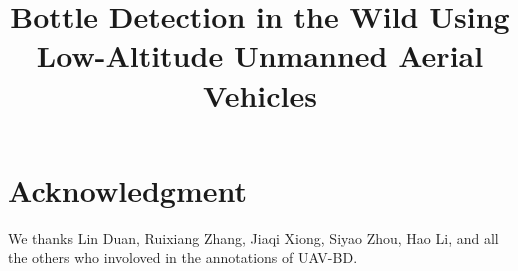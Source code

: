 \documentclass[conference]{IEEEtran}
\begin{document}
\title{Bottle Detection in the Wild Using Low-Altitude Unmanned Aerial Vehicles
}
\author{


}

\maketitle















\section*{Acknowledgment}

We thanks Lin Duan, Ruixiang Zhang, Jiaqi Xiong, Siyao Zhou, Hao Li, and all the others who involoved in the annotations of UAV-BD.

\end{document}
